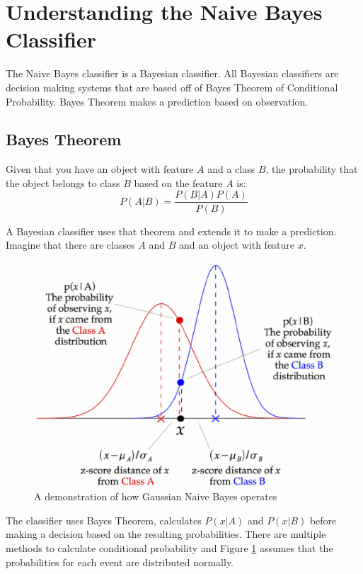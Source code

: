 \documentclass[11pt, twoside, reqno]{book}
\begin{document}
\section{Understanding the Naive Bayes Classifier}
\hspace{0.2in} The Naive Bayes classifier is a Bayesian classifier. All Bayesian classifiers are decision making systems that are based off of Bayes Theorem of Conditional Probability. Bayes Theorem makes a prediction based on observation. 

\subsection{Bayes Theorem}

\begin{theorem}
Given that you have an object with feature $A$ and a class $B$, the probability that the object belongs to class $B$ based on the feature $A$ is:
\begin{equation}
\label{eq:bayes}
P(A|B) = \dfrac{P(B|A)P(A)}{P(B)}
\end{equation}
\end{theorem}

A Bayesian classifier uses that theorem and extends it to make a prediction. Imagine that there are classes $A$ and $B$ and an object with feature $x$.  
\begin{figure}[H]
\centering
	\includegraphics[scale=0.5]{bayes}
	\caption{A demonstration of how Gaussian Naive Bayes operates \cite{researchgate_2013}}\label{fig:bayes}
\end{figure}
The classifier uses Bayes Theorem, calculates $P(x|A)$ and $P(x|B)$ before making a decision based on the resulting probabilities. There are multiple methods to calculate conditional probability and Figure \ref{fig:bayes} assumes that the probabilities for each event are distributed normally. 
\end{document}
